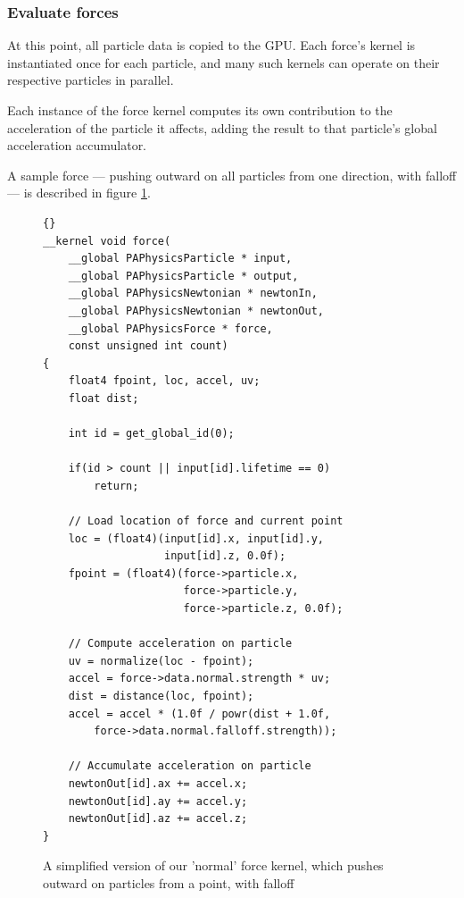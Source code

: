 \documentclass{acmsiggraph}
\begin{document}
\subsubsection{Evaluate forces}

At this point, all particle data is copied to the GPU. Each force's kernel is instantiated once for each particle, and many such kernels can operate on their respective particles in parallel.

Each instance of the force kernel computes its own contribution to the acceleration of the particle it affects, adding the result to that particle's global acceleration accumulator.

A sample force --- pushing outward on all particles from one direction, with falloff --- is described in figure \ref{forceCode}.

\begin{figure}

    \lstset{language=C}
    \lstset{basicstyle=\footnotesize\ttfamily}
    \lstset{numbers=left, numberstyle=\tiny, stepnumber=1, numbersep=5pt}
    \begin{lstlisting}[frame=trbl]{}
__kernel void force(
    __global PAPhysicsParticle * input,
    __global PAPhysicsParticle * output,
    __global PAPhysicsNewtonian * newtonIn,
    __global PAPhysicsNewtonian * newtonOut,
    __global PAPhysicsForce * force,
    const unsigned int count)
{
    float4 fpoint, loc, accel, uv;
    float dist;

    int id = get_global_id(0);

    if(id > count || input[id].lifetime == 0)
        return;

    // Load location of force and current point
    loc = (float4)(input[id].x, input[id].y,
                   input[id].z, 0.0f);
    fpoint = (float4)(force->particle.x,
                      force->particle.y,
                      force->particle.z, 0.0f);

    // Compute acceleration on particle
    uv = normalize(loc - fpoint);
    accel = force->data.normal.strength * uv;
    dist = distance(loc, fpoint);
    accel = accel * (1.0f / powr(dist + 1.0f,
        force->data.normal.falloff.strength));

    // Accumulate acceleration on particle
    newtonOut[id].ax += accel.x;
    newtonOut[id].ay += accel.y;
    newtonOut[id].az += accel.z;
}
    \end{lstlisting}

    \caption{A simplified version of our 'normal' force kernel, which pushes outward on particles from a point, with falloff}
    \label{forceCode}
\end{figure}
\end{document}
